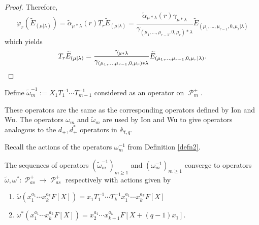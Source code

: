 \documentclass[ALCO,Unicode]{cedram}
\DeclareMathOperator{\sP}{\mathscr{P} }
\begin{document}
\begin{proof}
Therefore, 
$$\varphi_{r}(\widetilde{E}_{(\mu|\lambda)}) = \widetilde{\alpha}_{\mu*\lambda}(r) T_r \widetilde{E}_{(\mu|\lambda)} = \frac{\widetilde{\alpha}_{\mu*\lambda}(r)\gamma_{\mu*\lambda}}{\gamma_{(\mu_1,\ldots,\mu_{r-1},0,\mu_r)*\lambda}} \widetilde{E}_{(\mu_1,\ldots,\mu_{r-1},0,\mu_r|\lambda)}$$ which yields 
$$T_r\widetilde{E}_{(\mu|\lambda)} = \frac{\gamma_{\mu*\lambda}}{\gamma_{(\mu_1,\ldots,\mu_{r-1},0,\mu_r)*\lambda}} \widetilde{E}_{(\mu_1,\ldots,\mu_{r-1},0,\mu_r|\lambda)}. \qedhere$$
\end{proof}

\begin{defi}\label{defn 10}
 Define $\widetilde{\omega}_m^{-1} := X_1T_1^{-1}\cdots T_{m-1}^{-1}$ considered as an operator on $\sP_{m}^{+}$.
\end{defi}

\begin{rema}
    These operators are the same as the corresponding operators defined by Ion and Wu. The operators $\omega_m$ and $\widetilde{\omega}_m$ are used by Ion and Wu \cite{Ion_2022} to give operators analogous to the $d_{+},d_{+}^{*}$ operators in $\mathbb{A}_{t,q}$.
\end{rema}

Recall the actions of the operators $\omega_{m}^{-1}$ from Definition \ref{defn2}.

\begin{lemm}\label{pis converges}
    The sequences of operators $(\widetilde{\omega}_m^{-1})_{m\geq 1}$ and $(\omega_{m}^{-1})_{m \geq 1}$ converge to operators $\widetilde{\omega}, \omega^{*}: \sP_{as}^{+} \rightarrow \sP_{as}^{+}$ respectively with actions given by 
    \begin{enumerate}
        \item $\widetilde{\omega}(x_1^{a_1}\cdots x_k^{a_k}F[X]) = x_1T_1^{-1}\cdots T_{k}^{-1}x_1^{a_1}\cdots x_k^{a_k}F[X]$ \label{tilde omega action}
        \item $\omega^{*}(x_1^{a_1}\cdots x_k^{a_k}F[X]) = x_2^{a_1}\cdots x_{k+1}^{a_k}F[X+(q-1)x_1].$
    \end{enumerate}

    
\end{lemm}
\end{document}
